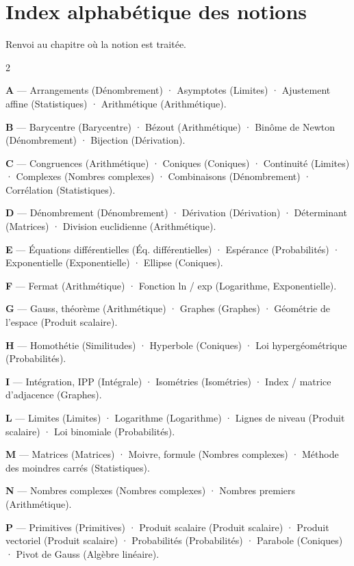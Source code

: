 \section{Index alphabétique des notions}

\noindent\footnotesize Renvoi au chapitre où la notion est traitée.\normalsize
\par\smallskip
\begin{multicols}{2}\footnotesize\raggedright
\textbf{A} — Arrangements (Dénombrement) · Asymptotes (Limites) · Ajustement affine (Statistiques) · Arithmétique (Arithmétique).\par
\textbf{B} — Barycentre (Barycentre) · Bézout (Arithmétique) · Binôme de Newton (Dénombrement) · Bijection (Dérivation).\par
\textbf{C} — Congruences (Arithmétique) · Coniques (Coniques) · Continuité (Limites) · Complexes (Nombres complexes) · Combinaisons (Dénombrement) · Corrélation (Statistiques).\par
\textbf{D} — Dénombrement (Dénombrement) · Dérivation (Dérivation) · Déterminant (Matrices) · Division euclidienne (Arithmétique).\par
\textbf{E} — Équations différentielles (Éq. différentielles) · Espérance (Probabilités) · Exponentielle (Exponentielle) · Ellipse (Coniques).\par
\textbf{F} — Fermat (Arithmétique) · Fonction ln / exp (Logarithme, Exponentielle).\par
\textbf{G} — Gauss, théorème (Arithmétique) · Graphes (Graphes) · Géométrie de l'espace (Produit scalaire).\par
\textbf{H} — Homothétie (Similitudes) · Hyperbole (Coniques) · Loi hypergéométrique (Probabilités).\par
\textbf{I} — Intégration, IPP (Intégrale) · Isométries (Isométries) · Index / matrice d'adjacence (Graphes).\par
\textbf{L} — Limites (Limites) · Logarithme (Logarithme) · Lignes de niveau (Produit scalaire) · Loi binomiale (Probabilités).\par
\textbf{M} — Matrices (Matrices) · Moivre, formule (Nombres complexes) · Méthode des moindres carrés (Statistiques).\par
\textbf{N} — Nombres complexes (Nombres complexes) · Nombres premiers (Arithmétique).\par
\textbf{P} — Primitives (Primitives) · Produit scalaire (Produit scalaire) · Produit vectoriel (Produit scalaire) · Probabilités (Probabilités) · Parabole (Coniques) · Pivot de Gauss (Algèbre linéaire).\par

\end{multicols}
